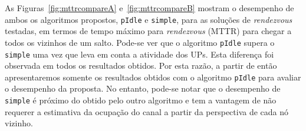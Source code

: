 {As Figuras~\ref{fig:mttrcompareA} e~\ref{fig:mttrcompareB} mostram o desempenho de ambos os algoritmos propostos, {\tt pIdle} e {\tt simple}, para as soluções de {\it rendezvous} testadas, em termos de tempo máximo para {\it rendezvous} (MTTR) para chegar a todos os vizinhos de um salto. Pode-se ver que o algoritmo {\tt pIdle} supera o {\tt simple} uma vez que leva em conta a atividade dos UPs. Esta diferença foi observada em todos os resultados obtidos. Por esta razão, a partir de então apresentaremos somente os resultados obtidos com o algoritmo {\tt pIdle} para avaliar o desempenho da proposta. No entanto, pode-se notar que o desempenho de {\tt simple} é próximo do obtido pelo outro algoritmo e tem a vantagem de não requerer a estimativa da ocupação do canal a partir da perspectiva de cada nó vizinho. %








}
